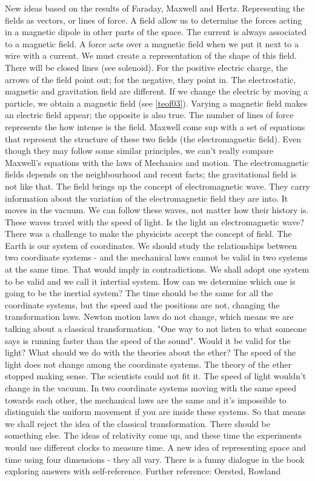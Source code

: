 \documentclass{cornell}
\begin{document}
%
{New ideas based on the results of Faraday, Maxwell and Hertz. Representing the fields as vectors, or lines of force. A field allow us to determine the forces acting in a magnetic dipole in other parts of the space. The current is always associated to a magnetic field. A force acts over a magnetic field when we put it next to a wire with a current. We must create a representation of the shape of this field. There will be closed lines (see solenoid). For the positive electric charge, the arrows of the field point out; for the negative, they point in. The electrostatic, magnetic and gravitation field are different. If we change the electric by moving a particle, we obtain a magnetic field (see \ref{teof03}). Varying a magnetic field makes an electric field appear; the opposite is also true. The number of lines of force represents the how intense is the field. Maxwell come sup with a set of equations that represent the structure of these two fields (the electromagnetic field). Even though they may follow some similar principles, we can't really compare Maxwell's equations with the laws of Mechanics and motion. The electromagnetic fields depends on the neighbourhood and recent facts; the gravitational field is not like that. }%
{The field brings up the concept of electromagnetic wave. They carry information about the variation of the electromagnetic field they are into. It moves in the vacuum. We can follow these waves, not matter how their history is. These waves travel with the speed of light. Is the light an electromagnetic wave? There was a challenge to make the physicists accept the concept of field. The Earth is our system of coordinates. We should study the relationships between two coordinate systems - and the mechanical laws cannot be valid in two systems at the same time. That would imply in contradictions. We shall adopt one system to be valid and we call it intertial system. How can we determine which one is going to be the inertial system? The time should be the same for all the coordinate systems, but the speed and the positions are not, changing the transformation laws. Newton motion laws do not change, which means we are talking about a classical transformation. }%
{"One way to not listen to what someone says is running faster than the speed of the sound". Would it be valid for the light? What should we do with the theories about the ether? The speed of the light does not change among the coordinate systems. The theory of the ether stopped making sense. The scientists could not fit it. The speed of light wouldn't change in the vacuum. In two coordinate systems moving with the same speed towards each other, the mechanical laws are the same and it's impossible to distinguish the uniform movement if you are inside these systems. So that means we shall reject the idea of the classical transformation. There should be something else. The ideas of relativity come up, and these time the experiments would use different clocks to measure time. A new idea of representing space and time using four dimensions - they all vary. There is a funny dialogue in the book exploring answers with self-reference.  }%
{Further reference: Oersted, Rowland}%
\end{document}
